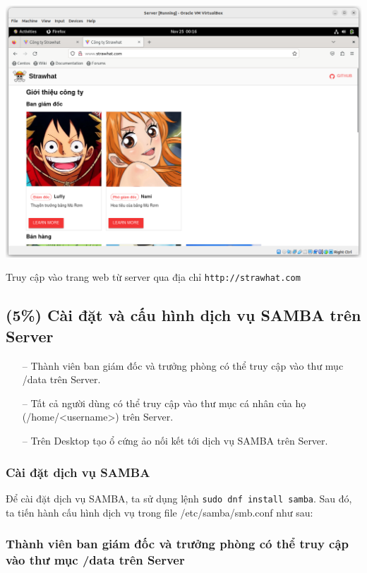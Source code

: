 \documentclass[a4paper, 11pt]{article}
\begin{document}
\begin{minipage}
    {\linewidth}
    \captionsetup{type=figure}
    \centering
    \includegraphics[width=\linewidth]{images/server-strawhat-com.png}
    \caption{Truy cập vào trang web từ server qua địa chỉ \texttt{http://strawhat.com}}
    \label{figure:server-strawhat-com}
\end{minipage}

\subsection{(5\%) Cài đặt và cấu hình dịch vụ SAMBA trên Server}

\begin{itemize}
    \item[--] Thành viên ban giám đốc và trưởng phòng có thể truy cập vào thư mục /data trên Server.
    \item[--] Tất cả người dùng có thể truy cập vào thư mục cá nhân của họ (/home/<username>) trên Server.
    \item[--] Trên Desktop tạo ổ cứng ảo nối kết tới dịch vụ SAMBA trên Server.
\end{itemize}

\subsubsection{Cài đặt dịch vụ SAMBA}

Để cài đặt dịch vụ SAMBA, ta sử dụng lệnh \texttt{sudo dnf install samba}.
Sau đó, ta tiến hành cấu hình dịch vụ trong file /etc/samba/smb.conf như sau:

\subsubsection{Thành viên ban giám đốc và trưởng phòng có thể truy cập vào thư mục /data trên Server}
\end{document}
